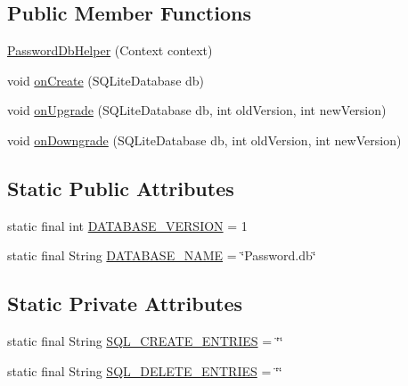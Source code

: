 \subsection*{Public Member Functions}
\begin{DoxyCompactItemize}
\item 
\hyperlink{a00011_a5253eee04657df75063746388f018998}{Password\+Db\+Helper} (Context context)
\item 
void \hyperlink{a00011_a98b247cd7e075d076b0364beee305621}{on\+Create} (S\+Q\+Lite\+Database db)
\item 
void \hyperlink{a00011_a47418a2bb9896d8cd648b4094755e6c7}{on\+Upgrade} (S\+Q\+Lite\+Database db, int old\+Version, int new\+Version)
\item 
void \hyperlink{a00011_a5a7757b503ddeb122c4633bcd98d70f0}{on\+Downgrade} (S\+Q\+Lite\+Database db, int old\+Version, int new\+Version)
\end{DoxyCompactItemize}
\subsection*{Static Public Attributes}
\begin{DoxyCompactItemize}
\item 
static final int \hyperlink{a00011_a4418255697bdbe4056215b3439562e5b}{D\+A\+T\+A\+B\+A\+S\+E\+\_\+\+V\+E\+R\+S\+I\+O\+N} = 1
\item 
static final String \hyperlink{a00011_a62e0f89c9b9f944cee181af556bfba76}{D\+A\+T\+A\+B\+A\+S\+E\+\_\+\+N\+A\+M\+E} = \char`\"{}Password.\+db\char`\"{}
\end{DoxyCompactItemize}
\subsection*{Static Private Attributes}
\begin{DoxyCompactItemize}
\item 
static final String \hyperlink{a00011_a179ee64b30ed865c0aa6600e25624635}{S\+Q\+L\+\_\+\+C\+R\+E\+A\+T\+E\+\_\+\+E\+N\+T\+R\+I\+E\+S} = \char`\"{}\char`\"{}
\item 
static final String \hyperlink{a00011_a4f4bdf660cf40b8e8789fbecdaf421ec}{S\+Q\+L\+\_\+\+D\+E\+L\+E\+T\+E\+\_\+\+E\+N\+T\+R\+I\+E\+S} = \char`\"{}\char`\"{}
\end{DoxyCompactItemize}


